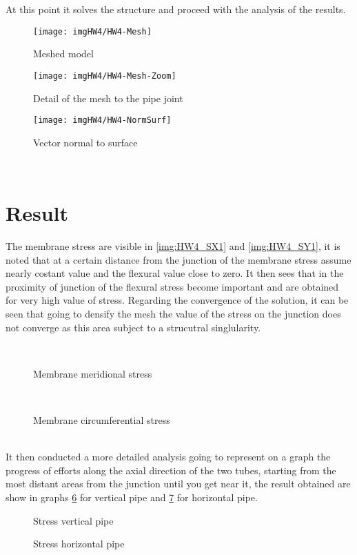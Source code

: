At this point it solves the structure and proceed with the analysis of the results.
\begin{figure}[!h]
\centering
\texttt{[image: imgHW4/HW4-Mesh]}
\caption{Meshed model}
\label{img:HW4_Mesh}
\end{figure}
\begin{figure}[!h]
\centering
\texttt{[image: imgHW4/HW4-Mesh-Zoom]}
\caption{Detail of the mesh to the pipe joint }
\label{img:HW4_MeshDetail}
\end{figure}
\begin{figure}[h]
\centering
\texttt{[image: imgHW4/HW4-NormSurf]}
\caption{Vector normal to surface}
\label{img:HW4-NormSurf}
\end{figure}\\
\pagebreak
\section{Result}
The membrane stress are visible in \ref{img:HW4_SX1} and \ref{img:HW4_SY1},
it is noted that at a certain distance from the junction of the membrane stress assume nearly costant value and the flexural value close to zero. It then sees that in the proximity of junction of the flexural stress become important and are obtained for very high value of stress.
Regarding the convergence of the solution, it can be seen that going to densify the mesh the value of the stress on the junction does not converge as this area subject to a strucutral singlularity.
\begin{figure}[!h]
\centering
{}\,
\caption{Membrane meridional stress}
\label{img:HW4-SX}
\end{figure}
\begin{figure}[!h]
\centering
{}\,
\caption{Membrane circumferential stress}
\label{img:HW4-SY}
\end{figure}\\\pagebreak
\newpage
\noindent It then conducted a more detailed analysis going to represent on a graph the progress of efforts along the axial direction of the two tubes, starting from the most distant areas from the junction until you get near it, the result obtained are show in graphs \ref{img:HW4-StressVerticalPipe} for vertical pipe and \ref{img:HW4-StressHorizontalPipe} for horizontal pipe.
\begin{figure}[!h]
\centering
    \resizebox{.8\linewidth}{!}{}
    \caption{Stress vertical pipe}
    \label{img:HW4-StressVerticalPipe}
\end{figure}
\begin{figure}[!h]
\centering
    \resizebox{.8\linewidth}{!}{}
    \caption{Stress horizontal pipe}
    \label{img:HW4-StressHorizontalPipe}
\end{figure}
